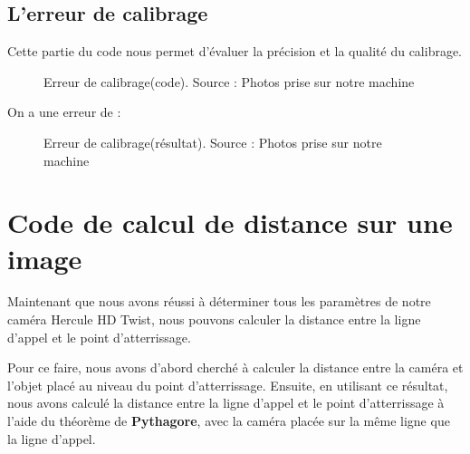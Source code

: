 \subsection{L'erreur de calibrage}

Cette partie du code nous permet d'évaluer la précision et la qualité du calibrage.

\begin{figure}[H]%
	\center%
	\setlength{\fboxsep}{5pt}%
	\setlength{\fboxrule}{0.5pt}%
	\caption[Erreur de calibrage(code)]{Erreur de calibrage(code). Source : Photos prise sur notre machine}
	\label{fig:Erreur de calibrage(code)}
\end{figure}

 
On a une erreur de :


\begin{figure}[H]%
	\center%
	\setlength{\fboxsep}{5pt}%
	\setlength{\fboxrule}{0.5pt}%
	\caption[ Erreur de calibrage(résultat)]{Erreur de calibrage(résultat). Source : Photos prise sur notre machine}
	\label{fig:Erreur de calibrage(résultat)}
\end{figure}






\newpage
\section{Code de calcul de distance sur une image}
 
 Maintenant que nous avons réussi à déterminer tous les paramètres de notre caméra Hercule HD Twist, nous pouvons calculer la distance entre la ligne d'appel et le point d'atterrissage.
 
 Pour ce faire, nous avons d'abord cherché à calculer la distance entre la caméra et l'objet placé au niveau du point d'atterrissage. Ensuite, en utilisant ce résultat, nous avons calculé la distance entre la ligne d'appel et le point d'atterrissage à l'aide du théorème de \textbf{Pythagore}, avec la caméra placée sur la même ligne que la ligne d'appel.
 

